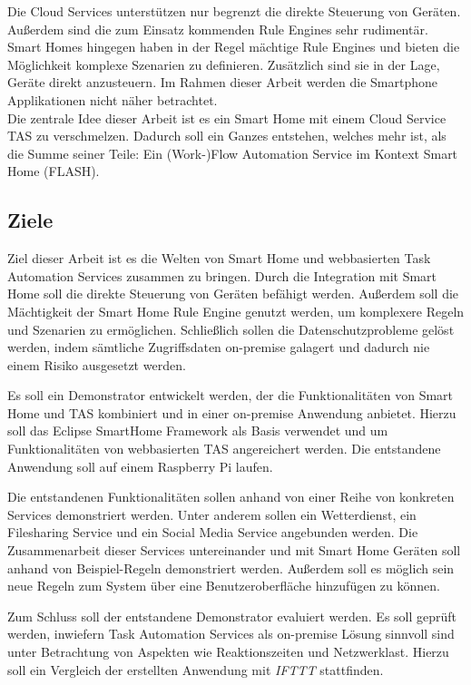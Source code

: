 Die Cloud Services unterstützen nur begrenzt die \glqq direkte\grqq{}  Steuerung von Geräten. Außerdem sind die zum Einsatz kommenden Rule Engines sehr rudimentär. Smart Homes hingegen haben in der Regel mächtige Rule Engines und bieten die Möglichkeit komplexe Szenarien zu definieren. Zusätzlich sind sie in der Lage, Geräte direkt anzusteuern. Im Rahmen dieser Arbeit werden die Smartphone Applikationen nicht näher betrachtet.\\

Die zentrale Idee dieser Arbeit ist es ein Smart Home mit einem Cloud Service TAS zu verschmelzen. Dadurch soll ein Ganzes entstehen, welches mehr ist, als die Summe seiner Teile: Ein (Work-)Flow Automation Service im Kontext Smart Home (FLASH).

\subsection{Ziele}
\label{sec:ziele}
Ziel dieser Arbeit ist es die Welten von Smart Home und webbasierten Task Automation Services zusammen zu bringen. Durch die Integration mit Smart Home soll die direkte Steuerung von Geräten befähigt werden. Außerdem soll die Mächtigkeit der Smart Home Rule Engine genutzt werden, um komplexere Regeln und Szenarien zu ermöglichen. Schließlich sollen die Datenschutzprobleme gelöst werden, indem sämtliche Zugriffsdaten on-premise galagert und dadurch nie einem Risiko ausgesetzt werden.

Es soll ein Demonstrator entwickelt werden, der die Funktionalitäten von Smart Home und TAS kombiniert und in einer on-premise Anwendung anbietet. Hierzu soll das Eclipse SmartHome Framework als Basis verwendet und um Funktionalitäten von webbasierten TAS angereichert werden. Die entstandene Anwendung soll auf einem Raspberry Pi\cite{rasp} laufen.

Die entstandenen Funktionalitäten sollen anhand von einer Reihe von konkreten Services demonstriert werden. Unter anderem sollen ein Wetterdienst, ein Filesharing Service und ein Social Media Service angebunden werden. Die Zusammenarbeit dieser Services untereinander und mit Smart Home Geräten soll anhand von Beispiel-Regeln demonstriert werden. Außerdem soll es möglich sein neue Regeln zum System über eine Benutzeroberfläche hinzufügen zu können.

Zum Schluss soll der entstandene Demonstrator evaluiert werden. Es soll geprüft werden, inwiefern Task Automation Services als on-premise Lösung sinnvoll sind unter Betrachtung von Aspekten wie Reaktionszeiten und Netzwerklast. Hierzu soll ein Vergleich der erstellten Anwendung mit \textit{IFTTT} stattfinden.

